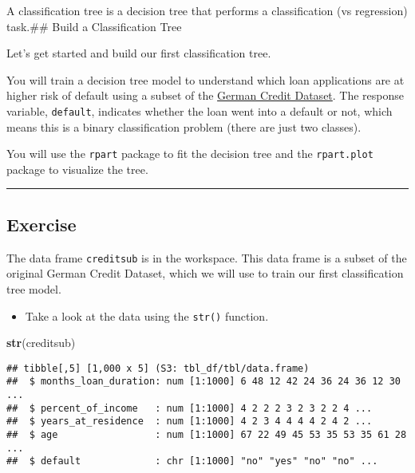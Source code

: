 \documentclass[
]{book}
\newenvironment{Shaded}{\begin{snugshade}}{\end{snugshade}}
\newcommand{\KeywordTok}[1]{\textcolor[rgb]{0.13,0.29,0.53}{\textbf{#1}}}
\newcommand{\NormalTok}[1]{#1}
\providecommand{\tightlist}{%
  \setlength{\itemsep}{0pt}\setlength{\parskip}{0pt}}
\begin{document}
A classification tree is a decision tree that performs a classification (vs regression) task.\#\# Build a Classification Tree

Let's get started and build our first classification tree.

You will train a decision tree model to understand which loan applications are at higher risk of default using a subset of the \href{https://archive.ics.uci.edu/ml/datasets/Statlog+\%28German+Credit+Data\%29}{German Credit Dataset}. The response variable, \texttt{default}, indicates whether the loan went into a default or not, which means this is a binary classification problem (there are just two classes).

You will use the \texttt{rpart} package to fit the decision tree and the \texttt{rpart.plot} package to visualize the tree.

\begin{center}\rule{0.5\linewidth}{0.5pt}\end{center}

\hypertarget{exercise}{%
\subsection*{Exercise}\label{exercise}}

The data frame \texttt{creditsub} is in the workspace. This data frame is a subset of the original German Credit Dataset, which we will use to train our first classification tree model.

\begin{itemize}
\tightlist
\item
  Take a look at the data using the \texttt{str()} function.
\end{itemize}

\begin{Shaded}
\begin{Highlighting}[]
\KeywordTok{str}\NormalTok{(creditsub)}
\end{Highlighting}
\end{Shaded}

\begin{verbatim}
## tibble[,5] [1,000 x 5] (S3: tbl_df/tbl/data.frame)
##  $ months_loan_duration: num [1:1000] 6 48 12 42 24 36 24 36 12 30 ...
##  $ percent_of_income   : num [1:1000] 4 2 2 2 3 2 3 2 2 4 ...
##  $ years_at_residence  : num [1:1000] 4 2 3 4 4 4 4 2 4 2 ...
##  $ age                 : num [1:1000] 67 22 49 45 53 35 53 35 61 28 ...
##  $ default             : chr [1:1000] "no" "yes" "no" "no" ...
\end{verbatim}
\end{document}
